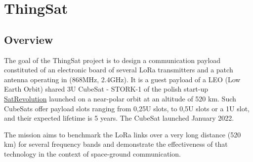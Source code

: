 \section{ThingSat}
\label{sec:case-study}

\subsection{Overview}



The goal of the ThingSat project is to design a communication payload
constituted of an electronic board of several LoRa transmitters and a patch
antenna operating in (868MHz, 2.4GHz). It is a guest payload of a LEO (Low Earth
Orbit) shared 3U CubeSat - STORK-1 of the polish start-up
\href{https://www.satrevolution.com/}{SatRevolution} launched on a near-polar
orbit at an altitude of 520 km.
Such CubeSats offer payload slots ranging from 0,25U slots, to 0,5U slots or a 1U slot, and their expected lifetime is 5 years.
The CubeSat launched January 2022. 


The mission aims to benchmark the LoRa links over a very long distance (520 km)
for several frequency bands and demonstrate the effectiveness of that technology
in the context of space-ground communication.

